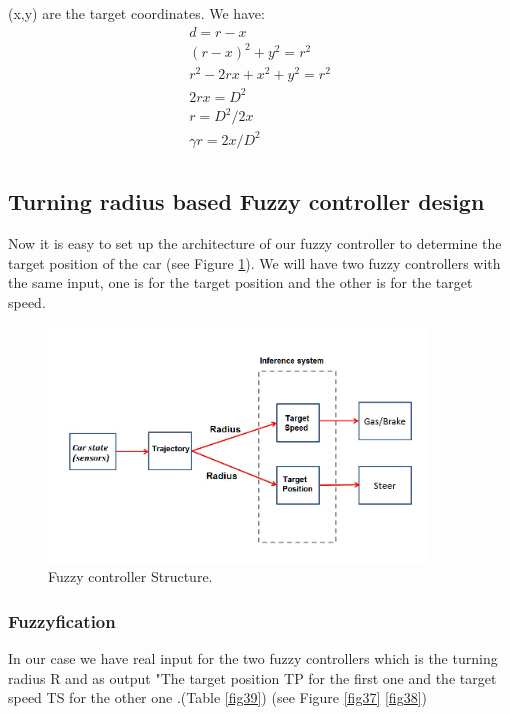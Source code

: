 \documentclass{llncs}
\begin{document}
(x,y) are the target coordinates. We have:\\
\begin{gather}
d = r - x\\
(r - x)^2 + y^2 = r^2  \\
r^2 - 2rx + x^2 + y^2 = r^2\\	
2rx = D^2\\	
r = D^2/2x\\
\gamma r = 2x/D^2\\
\end{gather}	

\subsection{Turning radius based Fuzzy controller design}
Now it is easy to set up the architecture of our fuzzy controller to determine the target position of the car (see Figure \ref {fig36}). We will have two fuzzy controllers with the same input, one is for the target position and the other is for the target speed. 
\begin{figure}[h!]
	
	\centering
	\includegraphics[width=0.9\textwidth]{fig/rayon21.png}
	\begin{minipage}{10cm}
		\centering
		\caption{\footnotesize Fuzzy controller Structure.}
		\label{fig36}
	\end{minipage} 
	
\end{figure}

\subsubsection{Fuzzyfication}

In our case we have real input for the two fuzzy controllers which is the turning radius R and as output "The target position TP  for the first one and the target speed TS  for the other one .(Table \ref{fig39}) (see Figure \ref{fig37} \ref{fig38})
\end{document}
